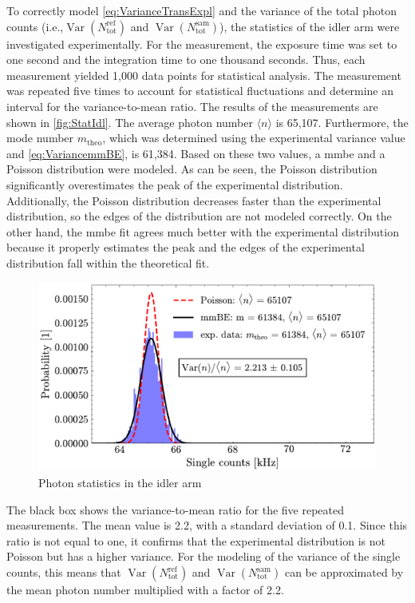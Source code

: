 To correctly model \autoref{eq:VarianceTransExpl} and the variance of the total photon counts (i.e.,$\operatorname{Var}\!\left( N_{\text{tot}}^{\text{ref}} \right)$ and $\operatorname{Var}\!\left( N_{\text{tot}}^{\text{sam}} \right)$), the statistics of the idler arm were investigated experimentally. \newline
For the measurement, the exposure time was set to one second and the integration time to one thousand seconds. Thus, each measurement yielded 1,000 data points for statistical analysis. The measurement was repeated five times to account for statistical fluctuations and determine an interval for the variance-to-mean ratio.
The results of the measurements are shown in \autoref{fig:StatIdl}. \newline
The average photon number $\langle n\rangle$ is 65,107. Furthermore, the mode number $m_{\mathrm{theo}}$, which was determined using the experimental variance value and \autoref{eq:VariancemmBE}, is 61,384. Based on these two values, a \acrshort{mmbe} and a Poisson distribution were modeled. As can be seen, the Poisson distribution significantly overestimates the peak of the experimental distribution. Additionally, the Poisson distribution decreases faster than the experimental distribution, so the edges of the distribution are not modeled correctly. On the other hand, the \acrshort{mmbe} fit agrees much better with the experimental distribution because it properly estimates the peak and the edges of the experimental distribution fall within the theoretical fit.
\begin{figure}[tb!]
	\centering
	\includegraphics[width=.9\textwidth]{Images/SingleStatisticsIdler_2.pdf}
	\caption{Photon statistics in the idler arm}
	\label{fig:StatIdl}
\end{figure}\newline
The black box shows the variance-to-mean ratio for the five repeated measurements. The mean value is 2.2, with a standard deviation of 0.1. Since this ratio is not equal to one, it confirms that the experimental distribution is not Poisson but has a higher variance. For the modeling of the variance of the single counts, this means that $\operatorname{Var}\!\left( N_{\text{tot}}^{\text{ref}} \right)$ and $\operatorname{Var}\!\left( N_{\text{tot}}^{\text{sam}} \right)$ can be approximated by the mean photon number multiplied with a factor of 2.2. \newline
